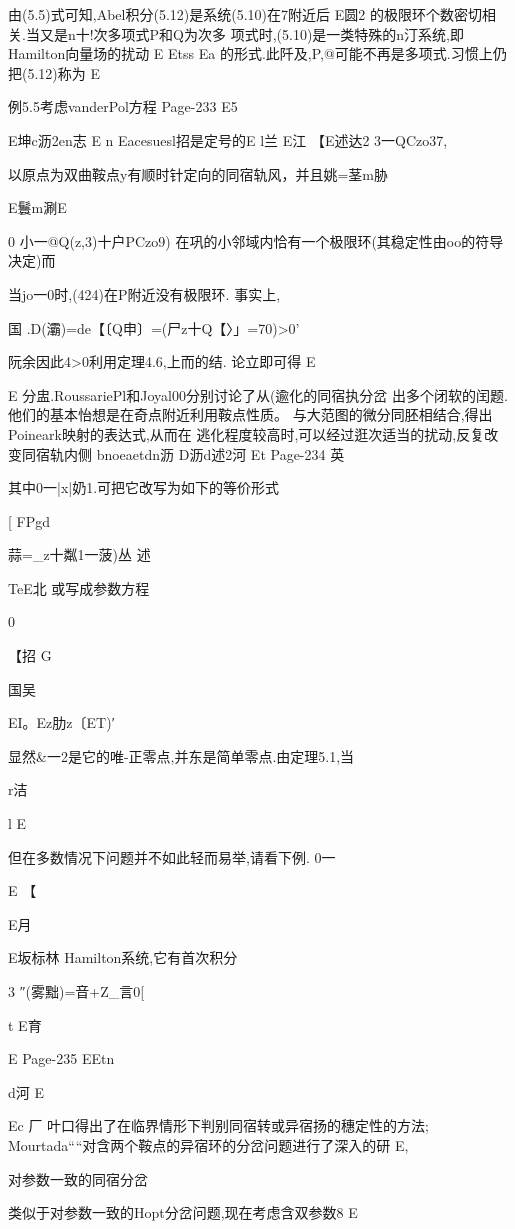 {{{{{{{{{{{{{由(5.5)式可知,Abel积分(5.12)是系统(5.10)在7附近后
E圆2
的极限环个数密切相关.当又是n十!次多项式P和Q为次多
项式时,(5.10)是一类特殊的n汀系统,即Hamilton向量场的扰动
E
Etss
Ea
的形式.此阡及,P,@可能不再是多项式.习惯上仍把(5.12)称为
E

例5.5考虑vanderPol方程
Page-233
E5

E坤c沥2en志
E
n
Eacesuesl招是定号的E
l兰
E江
【E述达2
3一QCzo37,

以原点为双曲鞍点y有顺时针定向的同宿轨风，并且姚=茎m胁

E鬟m涮E
{0
小一@Q(z,3)十户PCzo9)
在巩的小邻域内恰有一个极限环(其稳定性由oo的符导决定)而

当jo一0时,(424)在P附近没有极限环.
事实上,

国
.D(灞)=de【〔Q申〕=(尸z十Q【〉」=70)>0'

阮余因此4>0利用定理4.6,上而的结.
论立即可得
E

E
分盅.RoussariePl和Joyal00分别讨论了从(逾化的同宿执分岔
出多个闭软的闰题.他们的基本怡想是在奇点附近利用鞍点性质。
与大范图的微分同胚相结合,得出Poineark映射的表达式,从而在
逃化程度较高时,可以经过逛次适当的扰动,反复改变同宿轨内侧
bnoeaetdn沥
D沥d述2河
Et
Page-234
英

其中0一|x|奶1.可把它改写为如下的等价形式

[
FPgd

蒜=_z十粼1一菠)丛
述

TeE北
或写成参数方程

0

【招
G

国吴

EI。Ez肋z〔ET)′

显然&一2是它的唯-正零点,并东是简单零点.由定理5.1,当

r洁

l
E

但在多数情况下问题并不如此轻而易举,请看下例.
0一

E
【

E月

E坂标林
Hamilton系统,它有首次积分

3
″(雾黜)=音+Z_言0[

t
E育

E
Page-235
EEtn

d河
E

Ec
厂
叶口得出了在临界情形下判别同宿转或异宿扬的穗定性的方法;
Mourtada““对含两个鞍点的异宿环的分岔问题进行了深入的研
E,

对参数一致的同宿分岔

类似于对参数一致的Hopt分岔问题,现在考虑含双参数8
E

}}}}}}}}}}}}}}
